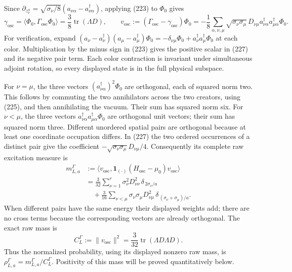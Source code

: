 \documentclass[
  11pt,
]{article}
\begin{document}
Since \(\partial_{z_\nu^\alpha}
=\sqrt{\sigma_\nu/8}(a_{\nu\alpha}-a_{\nu\alpha}^{\dagger})\), applying
(223) to \(\Phi_0\) gives \[
 \gamma_{\mathrm{osc}}=
 \langle\Phi_0,\Gamma_{\mathrm{osc}}\Phi_0\rangle
       =\frac38\operatorname{tr}(\Lambda D),\qquad
 v_{\mathrm{osc}}
   :=(\Gamma_{\mathrm{osc}}-\gamma_{\mathrm{osc}})\Phi_0
   =-\frac18\sum_{\alpha,\nu,\mu}
       \sqrt{\sigma_\nu\sigma_\mu}\,D_{\nu\mu}
       a_{\nu\alpha}^{\dagger}a_{\mu\alpha}^{\dagger}\Phi_0.
 \tag{227}
\] For verification, expand
\((a_\nu-a_\nu^\dagger)(a_\mu-a_\mu^\dagger)\Phi_0
=-\delta_{\nu\mu}\Phi_0+
a_\nu^\dagger a_\mu^\dagger\Phi_0\) at each color. Multiplication by the
minus sign in (223) gives the positive scalar in (227) and its negative
pair term. Each color contraction is invariant under simultaneous
adjoint rotation, so every displayed state is in the full physical
subspace.

For \(\nu=\mu\), the three vectors \((a_{\nu\alpha}^{\dagger})^2\Phi_0\)
are orthogonal, each of squared norm two. This follows by commuting the
two annihilators across the two creators, using (225), and then
annihilating the vacuum. Their sum has squared norm six. For
\(\nu<\mu\), the three vectors
\(a_{\nu\alpha}^{\dagger}a_{\mu\alpha}^{\dagger}\Phi_0\) are orthogonal
unit vectors; their sum has squared norm three. Different unordered
spatial pairs are orthogonal because at least one coordinate occupation
differs. In (227) the two ordered occurrences of a distinct pair give
the coefficient \(-\sqrt{\sigma_\nu\sigma_\mu}D_{\nu\mu}/4\).
Consequently its complete raw excitation measure is \[
 \begin{split}
 m^{\Gamma}_{L,a}
 &:=\langle v_{\mathrm{osc}},
       \mathbf1_{(\cdot)}(H_{\mathrm{osc}}-\mu_0)v_{\mathrm{osc}}\rangle\\
 &=\frac3{32}\sum_{\nu=1}^r
        \sigma_\nu^2D_{\nu\nu}^2\,\delta_{\,2\sigma_\nu/a}\\
 &\quad+\frac3{16}\sum_{\nu<\mu}
        \sigma_\nu\sigma_\mu D_{\nu\mu}^2\,
                      \delta_{\,(\sigma_\nu+\sigma_\mu)/a}.
 \end{split}
 \tag{228}
\] When different pairs have the same energy their displayed weights
add; there are no cross terms because the corresponding vectors are
already orthogonal. The exact raw mass is \[
 C_L^{\Gamma}:=\|v_{\mathrm{osc}}\|^2
       =\frac3{32}\operatorname{tr}(\Lambda D\Lambda D).
 \tag{229}
\] Thus the normalized probability, using its displayed nonzero raw
mass, is \(\rho_{L,a}^{\Gamma}=m_{L,a}^{\Gamma}/C_L^\Gamma\). Positivity
of this mass will be proved quantitatively below.
\end{document}
